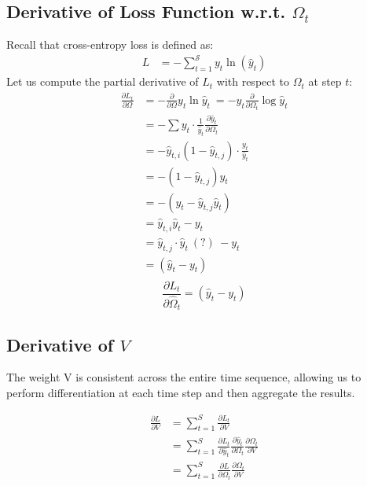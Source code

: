 \documentclass{article}
\begin{document}
\subsection{Derivative of Loss Function w.r.t. $\Omega_t$}
Recall that cross-entropy loss is defined as:
\begin{align*}
    L &=-\sum_{t=1}^{\mathcal{S}} y_{t} \ln (\hat{y}_t)
\end{align*} 
Let us compute the partial derivative of $L_t$ with respect to $\Omega_t$ at step $t$:
\begin{align*}
    \frac{\partial L_t}{\partial \Omega} & =-\frac{\partial}{\partial \Omega} y_{t} \ln \hat{y}_t ~=- y_{t} \frac{\partial }{\partial \Omega_{t}} \log \hat{y}_t \\
& =-\sum y_{t} \cdot \frac{1}{\hat{y}_{t}}\frac{\partial \hat{y}_t}{\partial \Omega_{t}} \\
& =- \hat{y}_{t,i}\left(1-\hat{y}_{t,j}\right) \cdot \frac{y_{t}}{\hat{y}_{t}} \\
& =-\left(1-\hat{y}_{t,j}\right) y_{t} \\
& =-\left(y_{t}-\hat{y}_{t,j} \hat{y}_{t}\right) \\
& = \hat{y}_{t,i} \hat{y}_{t}- y_{t} \\
& =\hat{y}_{t,j} \cdot \hat{y}_{t}~(?)~- y_{t} \\
& = (\hat{y}_{t}-y_{t}) \\
\end{align*}
\begin{equation}
\label{eqn:partial_L_omega}
    \frac{\partial L_t}{\partial \hat{\Omega}_t} = (\hat{y}_{t}-y_{t})
\end{equation}
\subsection{Derivative of $V$}
The weight V is consistent across the entire time sequence, allowing us to perform differentiation at each time step and then aggregate the results. 

\begin{align*} 
\frac{\partial L}{\partial V} &= \sum_{t=1}^{S} \frac{\partial L_{t}}{\partial V} \\
&= \sum_{t=1}^{S} \frac{\partial L_{t}}{\partial \hat{y}_{t}} \frac{\partial \hat{y}_{t}}{\partial \Omega_{t}} \frac{\partial \Omega_{t}}{\partial V}\\
&= \sum_{t=1}^{S} \frac{\partial L}{\partial \Omega_t}  \frac{\partial \Omega_{t}}{\partial V}
\end{align*}
\end{document}

